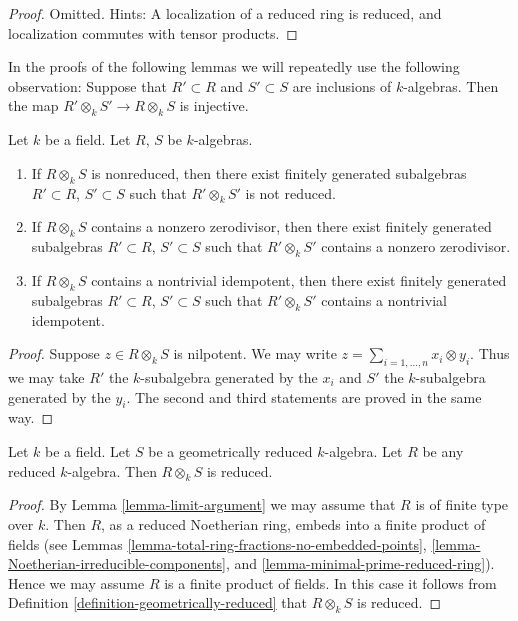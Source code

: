 \begin{proof}
Omitted. Hints: A localization of a reduced ring is reduced, and
localization commutes with tensor products.
\end{proof}

\noindent
In the proofs of the following lemmas we will repeatedly use
the following observation: Suppose that $R' \subset R$ and
$S' \subset S$ are inclusions of $k$-algebras.
Then the map $R' \otimes_k S' \to R \otimes_k S$
is injective.

\begin{lemma}
\label{lemma-limit-argument}
Let $k$ be a field. Let $R$, $S$ be $k$-algebras.
\begin{enumerate}
\item If $R \otimes_k S$ is nonreduced, then there exist
finitely generated subalgebras $R' \subset R$,
$S' \subset S$ such that $R' \otimes_k S'$ is not reduced.
\item If $R \otimes_k S$ contains a nonzero zerodivisor, then there exist
finitely generated subalgebras $R' \subset R$,
$S' \subset S$ such that $R' \otimes_k S'$ contains a nonzero zerodivisor.
\item If $R \otimes_k S$ contains a nontrivial idempotent, then there exist
finitely generated subalgebras $R' \subset R$,
$S' \subset S$ such that $R' \otimes_k S'$ contains a nontrivial idempotent.
\end{enumerate}
\end{lemma}

\begin{proof}
Suppose $z \in R \otimes_k S$ is nilpotent. We may write
$z = \sum_{i = 1, \ldots, n} x_i \otimes y_i$.
Thus we may take $R'$ the $k$-subalgebra generated by
the $x_i$ and $S'$ the $k$-subalgebra generated by the $y_i$.
The second and third statements are proved in the same way.
\end{proof}

\begin{lemma}
\label{lemma-geometrically-reduced-any-reduced-base-change}
Let $k$ be a field.
Let $S$ be a geometrically reduced $k$-algebra.
Let $R$ be any reduced $k$-algebra.
Then $R \otimes_k S$ is reduced.
\end{lemma}

\begin{proof}
By Lemma \ref{lemma-limit-argument}
we may assume that $R$ is of finite type over $k$.
Then $R$, as a reduced Noetherian ring, embeds into a finite
product of fields
(see Lemmas \ref{lemma-total-ring-fractions-no-embedded-points},
\ref{lemma-Noetherian-irreducible-components}, and
\ref{lemma-minimal-prime-reduced-ring}).
Hence we may assume $R$ is a finite product of
fields. In this case it follows from
Definition \ref{definition-geometrically-reduced}
that $R \otimes_k S$ is reduced.
\end{proof}


